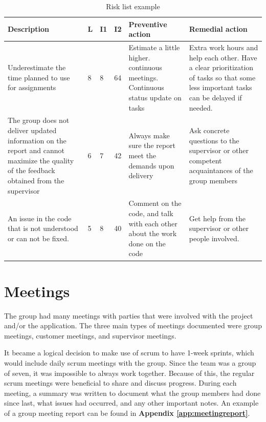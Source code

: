 \begin{table}[!h]
\begin{center}
	\caption{Risk list example} 
	\label{Tab:riskexample}
	\begin{tabular}{ | p{3.5cm} | p{2cm} | p{1.5cm} | p{2cm} | p{3.5cm} | p{3.5cm}|}

		\hline
		\textbf{Description} & \textbf{L} & \textbf{I1} & \textbf{I2} & \textbf{Preventive action} & \textbf{Remedial action} \\ \hline
		
		Underestimate the time planned to use for assignments & 8 & 8 & 64 & Estimate a little higher. continuous meetings. Continuous status update on tasks & Extra work hours and help each other. Have a clear prioritization of tasks so that some less important tasks can be delayed if needed. \\ \hline
		
		The group does not deliver updated information on the report and cannot maximize the quality of the feedback obtained from the supervisor & 6 & 7 & 42 & Always make sure the report meet the demands upon delivery & Ask concrete questions to the supervisor or other competent acquaintances of the group members \\ \hline
		
		An issue in the code that is not understood or can not be fixed. & 5 & 8 & 40 & Comment on the code, and talk with each other about the work done on the code & Get help from the supervisor or other people involved. \\ \hline
	\end{tabular}
\end{center}
\end{table}

\section{Meetings}

The group had many meetings with parties that were involved with the project and/or the application. The three main types of meetings documented were group meetings, customer meetings, and supervisor meetings.\newline 

It became a logical decision to make use of scrum to have 1-week sprints, which would include daily scrum meetings with the group. Since the team was a group of seven, it was impossible to always work together. Because of this, the regular scrum meetings were beneficial to share and discuss progress. During each meeting, a summary was written to document what the group members had done since last, what issues had occurred, and any other important notes. An example of a group meeting report can be found in \textbf{Appendix \ref{app:meetingreport}}.\newline

